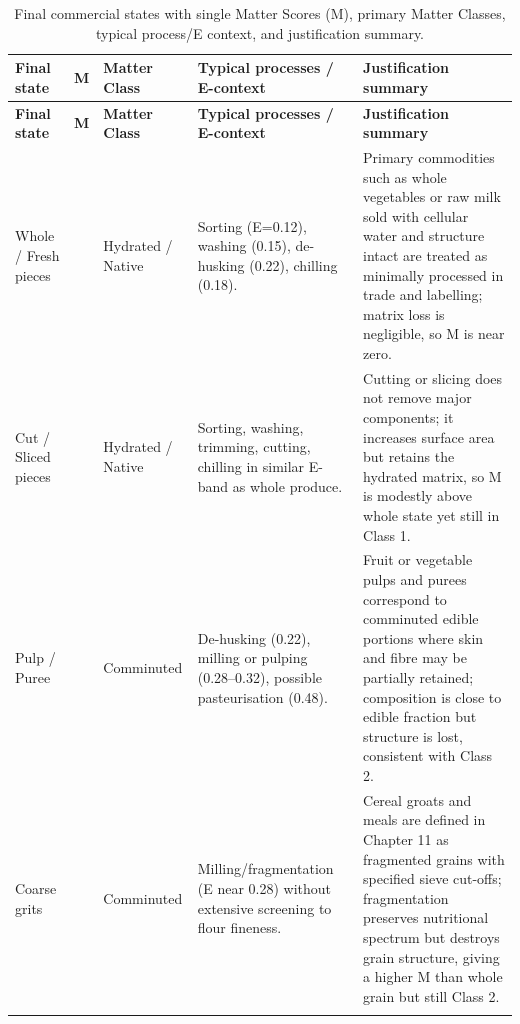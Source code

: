 \documentclass[12pt,a2paper]{article}
\begin{document}
\newpage
\begin{longtable}{
    p{6.5cm}   %
    >{\centering\arraybackslash}p{2.0cm} %
    p{8.0cm}   %
    p{12.0cm}  %
    p{23.0cm}  %
}
\caption{Final commercial states with single Matter Scores (M), primary Matter Classes, typical process/E context, and justification summary.} \label{tab:summary_m_scores} \\
\toprule
\textbf{Final state} & \textbf{M} & \textbf{Matter Class} & \textbf{Typical processes / E-context} & \textbf{Justification summary}\\
\midrule
\endfirsthead
\toprule
\textbf{Final state} & \textbf{M} & \textbf{Matter Class} & \textbf{Typical processes / E-context} & \textbf{Justification summary}\\
\midrule
\endhead
\bottomrule
\endfoot

Whole / Fresh pieces & 0.05 & Hydrated / Native & Sorting (E=0.12), washing (0.15), de-husking (0.22), chilling (0.18). & Primary commodities such as whole vegetables or raw milk sold with cellular water and structure intact are treated as minimally processed in trade and labelling; matrix loss is negligible, so M is near zero.\cite{FSSAI_Label_2020_M2,DGCI_CH11_M2} \\ \addlinespace

Cut / Sliced pieces & 0.10 & Hydrated / Native & Sorting, washing, trimming, cutting, chilling in similar E-band as whole produce. & Cutting or slicing does not remove major components; it increases surface area but retains the hydrated matrix, so M is modestly above whole state yet still in Class 1.\cite{FSSAI_Label_2020_M2} \\ \addlinespace

Pulp / Puree & 0.25 & Comminuted & De-husking (0.22), milling or pulping (0.28--0.32), possible pasteurisation (0.48). & Fruit or vegetable pulps and purees correspond to comminuted edible portions where skin and fibre may be partially retained; composition is close to edible fraction but structure is lost, consistent with Class 2.\cite{DGCI_CH11_M2,FSSAI_Dairy_2025_M2} \\ \addlinespace

Coarse grits & 0.30 & Comminuted & Milling/fragmentation (E near 0.28) without extensive screening to flour fineness. & Cereal groats and meals are defined in Chapter 11 as fragmented grains with specified sieve cut-offs; fragmentation preserves nutritional spectrum but destroys grain structure, giving a higher M than whole grain but still Class 2.\cite{DGCI_CH11_M2,WCO_CH11_Notes_M2} \\ \addlinespace


\end{longtable}
\end{document}
